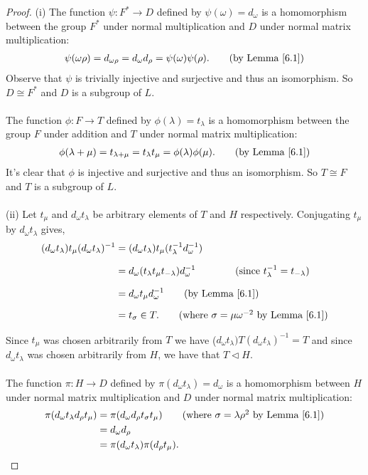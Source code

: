 \begin{proof} 
(i) The function $\psi: F^* \rightarrow D$ defined by $\psi(\omega) = d_\omega$ is a homomorphism between the group $F^*$ under normal multiplication and $D$ under normal matrix multiplication:
\begin{align*} \psi(\omega \rho) = d_{\omega \rho} =  d_\omega d_\rho = \psi(\omega) \psi(\rho). \tag{by Lemma \ref{6.1}}
\end{align*}
Observe that $\psi$ is trivially injective and surjective and thus an isomorphism. So $D\cong F^*$ and $D$ is a subgroup of $L$.\\
\\
 The function $\phi: F \rightarrow T$ defined by $\phi(\lambda) = t_\lambda$ is a homomorphism between the group $F$ under addition and $T$ under normal matrix multiplication:
\begin{align*} \phi(\lambda + \mu) = t_{\lambda + \mu} = t_\lambda t_\mu = \phi(\lambda) \phi(\mu). \tag{by Lemma \ref{6.1}}
\end{align*}
It's clear that $\phi$ is injective and surjective and thus an isomorphism. So $ T \cong F$ and $T$ is a subgroup of $L$. \\
\\
(ii) Let $t_\mu$ and $d_\omega t_\lambda$ be arbitrary elements of $T$ and $H$ respectively. Conjugating $t_\mu$ by $d_\omega t_\lambda$ gives,
\begin{align*} (d_\omega t_\lambda) t_\mu (d_\omega t_\lambda)^{-1} &= (d_\omega t_\lambda) t_\mu (t^{-1}_\lambda d^{-1}_\omega) \\[1.5ex]
&=
d_\omega (t_\lambda t_\mu t_{-\lambda}) d^{-1}_\omega \qquad \tag{since $t^{-1}_\lambda=t_{-\lambda}$} \\[1.5ex] 
&=
d_\omega t_\mu d^{-1}_\omega \tag{by Lemma \ref{6.1}} \\[1.5ex] 
&= t_\sigma \in T. \tag{where $\sigma = \mu \omega^{-2}$ by Lemma \ref{6.1}}
\end{align*}

Since $t_\mu$ was chosen arbitrarily from $T$ we have ($d_\omega t_\lambda) T (d_\omega t_\lambda)^{-1} = T$ and since $d_\omega t_\lambda$ was chosen arbitrarily from $H$, we have that $T \vartriangleleft H$. \\
\\
The function $\pi: H \rightarrow D$ defined by $\pi(d_\omega t_\lambda) = d_\omega$ is a homomorphism between $H$ under normal matrix multiplication and $D$ under normal matrix multiplication:
\begin{align*} \pi(d_\omega t_\lambda d_\rho t_\mu) &= \pi(d_\omega d_\rho t_\sigma t_\mu) \tag{where $\sigma = \lambda \rho^{2}$ by Lemma \ref{6.1}}
\\ &= d_\omega d_\rho
\\ &= \pi(d_\omega t_\lambda)\pi(d_\rho t_\mu).
\end{align*}


\end{proof}
